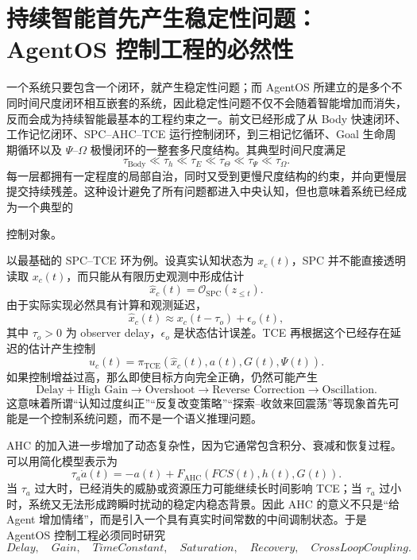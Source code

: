 \section{持续智能首先产生稳定性问题：AgentOS 控制工程的必然性}

一个系统只要包含一个闭环，就产生稳定性问题；而 AgentOS 所建立的是多个不同时间尺度闭环相互嵌套的系统，因此稳定性问题不仅不会随着智能增加而消失，反而会成为持续智能最基本的工程约束之一。前文已经形成了从 Body 快速闭环、工作记忆闭环、SPC--AHC--TCE 运行控制闭环，到三相记忆循环、Goal 生命周期循环以及 $\Psi$--$\Omega$ 极慢闭环的一整套多尺度结构。其典型时间尺度满足
\[
\tau_{\mathrm{Body}}
\ll
\tau_{h}
\ll
\tau_{E}
\ll
\tau_{\Theta}
\ll
\tau_{\Psi}
\ll
\tau_{\Omega}.
\]
每一层都拥有一定程度的局部自治，同时又受到更慢尺度结构的约束，并向更慢层提交持续残差。这种设计避免了所有问题都进入中央认知，但也意味着系统已经成为一个典型的
\begin{statementbox}
\centering
{}
\end{statementbox}
控制对象。

以最基础的 SPC--TCE 环为例。设真实认知状态为 $x_c(t)$，SPC 并不能直接透明读取 $x_c(t)$，而只能从有限历史观测中形成估计
\[
\hat{x}_c(t)
=
\mathcal O_{\mathrm{SPC}}
\left(
z_{\leq t}
\right).
\]
由于实际实现必然具有计算和观测延迟，
\[
\hat{x}_c(t)
\approx
x_c(t-\tau_o)+\epsilon_o(t),
\]
其中 $\tau_o>0$ 为 observer delay，$\epsilon_o$ 是状态估计误差。TCE 再根据这个已经存在延迟的估计产生控制
\[
u_c(t)
=
\pi_{\mathrm{TCE}}
\left(
\hat{x}_c(t),
a(t),
G(t),
\Psi(t)
\right).
\]
如果控制增益过高，那么即使目标方向完全正确，仍然可能产生
\[
\text{Delay}
+
\text{High Gain}
\rightarrow
\text{Overshoot}
\rightarrow
\text{Reverse Correction}
\rightarrow
\text{Oscillation}.
\]
这意味着所谓“认知过度纠正”“反复改变策略”“探索--收敛来回震荡”等现象首先可能是一个控制系统问题，而不是一个语义推理问题。

AHC 的加入进一步增加了动态复杂性，因为它通常包含积分、衰减和恢复过程。可以用简化模型表示为
\[
\tau_a\dot a(t)
=
-a(t)
+
F_{\mathrm{AHC}}
\left(
FCS(t),h(t),G(t)
\right).
\]
当 $\tau_a$ 过大时，已经消失的威胁或资源压力可能继续长时间影响 TCE；当 $\tau_a$ 过小时，系统又无法形成跨瞬时扰动的稳定内稳态背景。因此 AHC 的意义不只是``给 Agent 增加情绪''，而是引入一个具有真实时间常数的中间调制状态。于是 AgentOS 控制工程必须同时研究
\[
Delay,\quad
Gain,\quad
TimeConstant,\quad
Saturation,\quad
Recovery,\quad
CrossLoopCoupling.
\]

